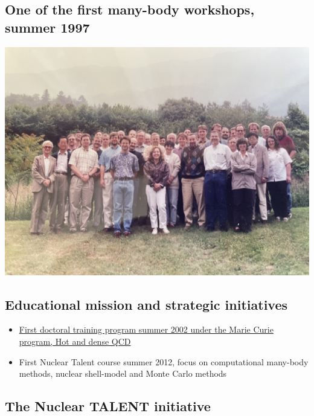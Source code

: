 \documentclass[%
oneside,                 %
final,                   %
10pt]{article}
\begin{document}
\noindent
\subsection{One of the first many-body workshops, summer 1997}

\vspace{6mm}

\centerline{\includegraphics[width=1.0\linewidth]{Photos/manybody1997.jpeg}}

\vspace{6mm}

\subsection{Educational mission and strategic initiatives}

\begin{itemize}
\item \href{{https://www.ectstar.eu/wp-content/uploads/2020/07/annualrep2002.pdf}}{First doctoral training program summer 2002 under the Marie Curie program, Hot and dense QCD}

\item First Nuclear Talent course summer 2012, focus on computational many-body methods, nuclear shell-model and Monte Carlo methods
\end{itemize}

\noindent
\subsection{The Nuclear TALENT initiative}
\end{document}
